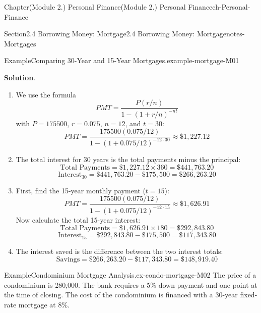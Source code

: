 \documentclass[oneside,10pt,]{book}
\newcommand{\blocktitlefont}{\relax}
\begin{document}
\begin{chapterptx}{Chapter}{(Module 2.) Personal Finance}{}{(Module 2.) Personal Finance}{}{}{ch-Personal-Finance}
\begin{sectionptx}{Section}{2.4 Borrowing Money: Mortgage}{}{2.4 Borrowing Money: Mortgage}{}{}{notes-Mortgages}
\begin{example}{Example}{Comparing 30-Year and 15-Year Mortgages.}{example-mortgage-M01}
\par\smallskip%
\noindent\textbf{\blocktitlefont Solution}.\hypertarget{example-mortgage-M01-3}{}\quad{}%
\begin{enumerate}
\item{}We use the formula%
\begin{equation*}
PMT = \frac{P(r/n)}{1-(1+r/n)^{-nt}}
\end{equation*}
with \(P = 175500\), \(r = 0.075\), \(n = 12\), and \(t = 30\):%
\begin{equation*}
PMT = \frac{175500(0.075/12)}{1-(1+0.075/12)^{-12 \cdot 30}} \approx \$1,227.12
\end{equation*}
%
\item{}The total interest for 30 years is the total payments minus the principal:%
\begin{equation*}
\text{Total Payments} = \$1,227.12 \times 360 = \$441,763.20
\end{equation*}
%
\begin{equation*}
\text{Interest}_{30} = \$441,763.20 - \$175,500 = \$266,263.20
\end{equation*}
%
\item{}First, find the 15-year monthly payment (\(t=15\)):%
\begin{equation*}
PMT = \frac{175500(0.075/12)}{1-(1+0.075/12)^{-12 \cdot 15}} \approx \$1,626.91
\end{equation*}
Now calculate the total 15-year interest:%
\begin{equation*}
\text{Total Payments} = \$1,626.91 \times 180 = \$292,843.80
\end{equation*}
%
\begin{equation*}
\text{Interest}_{15} = \$292,843.80 - \$175,500 = \$117,343.80
\end{equation*}
%
\item{}The interest saved is the difference between the two interest totals:%
\begin{equation*}
\text{Savings} = \$266,263.20 - \$117,343.80 = \$148,919.40
\end{equation*}
%
\end{enumerate}
\end{example}
\begin{example}{Example}{Condominium Mortgage Analysis.}{ex-condo-mortgage-M02}%
The price of a condominium is \textdollar{}280,000. The bank requires a 5\% down payment and one point at the time of closing. The cost of the condominium is financed with a 30-year fixed-rate mortgage at 8\%.%
%
\begin{enumerate}

\end{enumerate}
\end{example}
\end{sectionptx}
\end{chapterptx}
\end{document}

